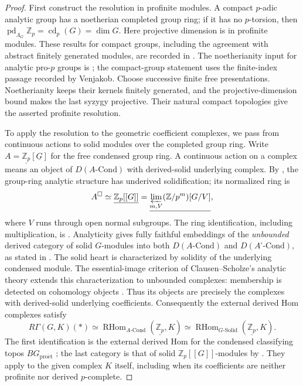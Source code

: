 \documentclass[11pt]{article}
\numberwithin{equation}{section}
\theoremstyle{definition}
\theoremstyle{remark}
\newcommand{\Z}{\mathbb Z}
\DeclareMathOperator{\RHom}{RHom}
\begin{document}
\begin{proof}
First construct the resolution in profinite modules. A compact $p$-adic analytic group has a noetherian completed group
ring; if it has no $p$-torsion, then
$\operatorname{pd}_{\Lambda_G}\Z_p=\operatorname{cd}_p(G)=\dim G$.
Here projective dimension is in profinite modules.
These results for compact groups, including the agreement with
abstract finitely generated modules, are recorded in
\cite[\S\S1.1--1.2, pp.~275--276]{Venjakob2002}.
The noetherianity input for analytic pro-$p$ groups is
\cite[V.2.2.4]{Lazard1965}; the compact-group statement uses the
finite-index passage recorded by Venjakob.
Choose successive finite free presentations.  Noetherianity keeps
their kernels finitely generated, and the projective-dimension
bound makes the last syzygy projective.  Their natural compact
topologies give the asserted profinite resolution.

To apply the resolution to the geometric coefficient complexes, we
pass from continuous actions to solid modules over the completed group
ring. Write
$A=\underline{\Z_p}[\underline G]$ for the free condensed group
ring.  A continuous action on a complex means an object of
$D(A\text{-}\mathrm{Cond})$ with derived-solid underlying complex.
By \cite[Lemma~1.3]{Anschutz2020}, the group-ring analytic
structure has underived solidification; its normalized ring is
\[
 A^\square\simeq\underline{\Z_p[[G]]}
   =\underline{\varprojlim_{m,V}(\Z/p^m)[G/V]},
\]
where $V$ runs through open normal subgroups.  The ring
identification, including multiplication, is
\cite[\S3.6, preceding Proposition~3.21]{Tang2026}.
Analyticity gives fully faithful embeddings of the \emph{unbounded}
derived category
of solid $G$-modules into both $D(A\text{-}\mathrm{Cond})$ and
$D(A^\square\text{-}\mathrm{Cond})$, as stated in
\cite[\S1, pp.~3--4]{Anschutz2020}.
The solid heart is characterized by solidity of the underlying
condensed module. The essential-image criterion of Clausen--Scholze's
analytic theory extends this characterization to unbounded complexes:
membership is detected on cohomology objects
\cite[Proposition~12.4 and Remark~12.5]{ScholzeAnalyticGeometry}.
Thus its objects are precisely the complexes with derived-solid
underlying coefficients. Consequently the external derived Hom
complexes satisfy
\[
 R\Gamma(G,K)(*)
 \simeq\RHom_{A\text{-}\mathrm{Cond}}(\underline{\Z_p},K)
 \simeq\RHom_{G\text{-}\mathrm{Solid}}(\underline{\Z_p},K).
\]
The first identification is the external derived Hom for the condensed
classifying topos $BG_{\mathrm{pro\acute et}}$
\cite[\S2, pp.~5 and~8]{Anschutz2020}; the last category is that of
solid $\Z_p[[G]]$-modules by
\cite[Proposition~3.21]{Tang2026}.
They apply to the given complex $K$ itself, including when its
coefficients are neither profinite nor derived $p$-complete.


\end{proof}
\end{document}
